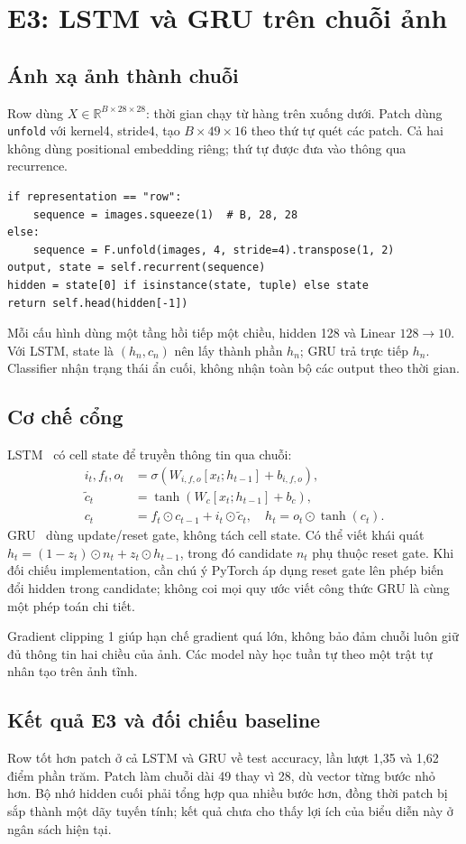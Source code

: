 \documentclass[11pt,a4paper]{article}
\begin{document}
\section{E3: LSTM và GRU trên chuỗi ảnh}\label{sec:e3}
\subsection{Ánh xạ ảnh thành chuỗi}
Row dùng $X\in\mathbb R^{B\times 28\times 28}$: thời gian chạy từ hàng trên xuống dưới. Patch dùng \texttt{unfold} với kernel4, stride4, tạo $B\times 49\times 16$ theo thứ tự quét các patch. Cả hai không dùng positional embedding riêng; thứ tự được đưa vào thông qua recurrence.
\begin{lstlisting}
if representation == "row":
    sequence = images.squeeze(1)  # B, 28, 28
else:
    sequence = F.unfold(images, 4, stride=4).transpose(1, 2)
output, state = self.recurrent(sequence)
hidden = state[0] if isinstance(state, tuple) else state
return self.head(hidden[-1])
\end{lstlisting}
Mỗi cấu hình dùng một tầng hồi tiếp một chiều, hidden 128 và Linear $128\to 10$. Với LSTM, state là $(h_n,c_n)$ nên lấy thành phần $h_n$; GRU trả trực tiếp $h_n$. Classifier nhận trạng thái ẩn cuối, không nhận toàn bộ các output theo thời gian.

\subsection{Cơ chế cổng}
LSTM~\cite{lstm} có cell state để truyền thông tin qua chuỗi:
\begin{align}
i_t,f_t,o_t&=\sigma(W_{i,f,o}[x_t;h_{t-1}]+b_{i,f,o}),\\
\widetilde c_t&=\tanh(W_c[x_t;h_{t-1}]+b_c),\\
c_t&=f_t\odot c_{t-1}+i_t\odot\widetilde c_t,\quad h_t=o_t\odot\tanh(c_t).
\end{align}
GRU~\cite{gru} dùng update/reset gate, không tách cell state. Có thể viết khái quát $h_t=(1-z_t)\odot n_t+z_t\odot h_{t-1}$, trong đó candidate $n_t$ phụ thuộc reset gate. Khi đối chiếu implementation, cần chú ý PyTorch áp dụng reset gate lên phép biến đổi hidden trong candidate; không coi mọi quy ước viết công thức GRU là cùng một phép toán chi tiết.

Gradient clipping 1 giúp hạn chế gradient quá lớn, không bảo đảm chuỗi luôn giữ đủ thông tin hai chiều của ảnh. Các model này học tuần tự theo một trật tự nhân tạo trên ảnh tĩnh.
\clearpage

\subsection{Kết quả E3 và đối chiếu baseline}


Row tốt hơn patch ở cả LSTM và GRU về test accuracy, lần lượt 1,35 và 1,62 điểm phần trăm. Patch làm chuỗi dài 49 thay vì 28, dù vector từng bước nhỏ hơn. Bộ nhớ hidden cuối phải tổng hợp qua nhiều bước hơn, đồng thời patch bị sắp thành một dãy tuyến tính; kết quả chưa cho thấy lợi ích của biểu diễn này ở ngân sách hiện tại.
\end{document}
